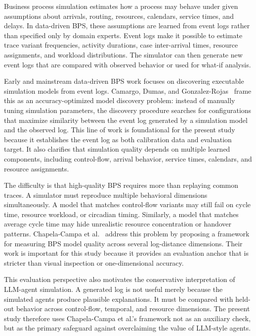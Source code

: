 Business process simulation estimates how a process may behave under
given assumptions about arrivals, routing, resources, calendars, service
times, and delays. In data-driven BPS, these assumptions are learned
from event logs rather than specified only by domain experts. Event logs
make it possible to estimate trace variant frequencies, activity
durations, case inter-arrival times, resource assignments, and workload
distributions. The simulator can then generate new event logs that are
compared with observed behavior or used for what-if analysis.

Early and mainstream data-driven BPS work focuses on discovering
executable simulation models from event logs. Camargo, Dumas, and
Gonzalez-Rojas~\cite{camargo2020automated} frame this as an
accuracy-optimized model discovery problem: instead of manually tuning simulation parameters, the
discovery procedure searches for configurations that maximize similarity
between the event log generated by a simulation model and the observed
log. This line of work is foundational for the present study because it
establishes the event log as both calibration data and evaluation
target. It also clarifies that simulation quality depends on multiple
learned components, including control-flow, arrival behavior, service
times, calendars, and resource assignments.

The difficulty is that high-quality BPS requires more than replaying
common traces. A simulator must reproduce multiple behavioral dimensions
simultaneously. A model that matches control-flow variants may still
fail on cycle time, resource workload, or circadian timing. Similarly, a
model that matches average cycle time may hide unrealistic resource
concentration or handover patterns. Chapela-Campa et al.~\cite{chapela2025quality} address
this problem by proposing a framework for measuring BPS model quality
across several log-distance dimensions. Their work is important for this
study because it provides an evaluation anchor that is stricter than
visual inspection or one-dimensional accuracy.

This evaluation perspective also motivates the conservative
interpretation of LLM-agent simulation. A generated log is not useful
merely because the simulated agents produce plausible explanations. It
must be compared with held-out behavior across control-flow, temporal,
and resource dimensions. The present study therefore uses Chapela-Campa
et al.'s framework not as an auxiliary check, but as the primary
safeguard against overclaiming the value of LLM-style agents.

